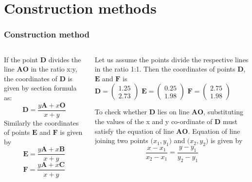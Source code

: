 \documentclass{beamer}
\renewcommand{\vec}[1]{\mathbf{#1}}
\begin{document}
\section*{Construction methods}
\begin{frame}[fragile]
\footnotesize
\frametitle{Construction method}
\begin{columns}
\begin{column}{0.5\textwidth}

 If the point $\vec{D}$ divides the line $\vec{AO}$ in the ratio x:y, the coordinates of $\vec{D}$ is given by section formula as:
\begin{equation} \vec{D} = \frac{y\vec{A} + x\vec{O}}{x+y}\end{equation}
Similarly the coordinates of points $\vec{E}$ and $\vec{F}$ is given by
\begin{equation} \vec{E} = \frac{y\vec{A} + x\vec{B}}{x+y}\end{equation}
\begin{equation} \vec{F} = \frac{y\vec{A} + x\vec{C}}{x+y}\end{equation}

 \end{column}
 
 
\begin{column}{0.5\textwidth} 
Let us assume the points divide the respective lines in the ratio 1:1. Then the coordinates of points $\vec{D}$, $\vec{E}$ and $\vec{F}$ is \\
 \quad $ \vec{D}= \begin{pmatrix}1.25\\2.73\end{pmatrix}$\quad
    \quad $\vec{E}=\begin{pmatrix}0.25\\1.98\end{pmatrix}$\quad
    \quad $\vec{F}=\begin{pmatrix}2.75\\1.98\end{pmatrix}$\quad
    
    
    To check whether $\vec{D}$ lies on line $\vec{AO}$, substituting the values of the x and y co-ordinate of $\vec{D}$ must satisfy the equation of line $\vec{AO}$. Equation of line joining two points 
$\big(x_1,y_1\big)$ and $\big(x_2,y_2\big)$ is given by \begin{equation} \frac{x-x_1}{x_2-x_1} = \frac{y-y_1}{y_2-y_1}  \end{equation}

  
 \end{column}
\end{columns}
\end{frame}
\end{document}
